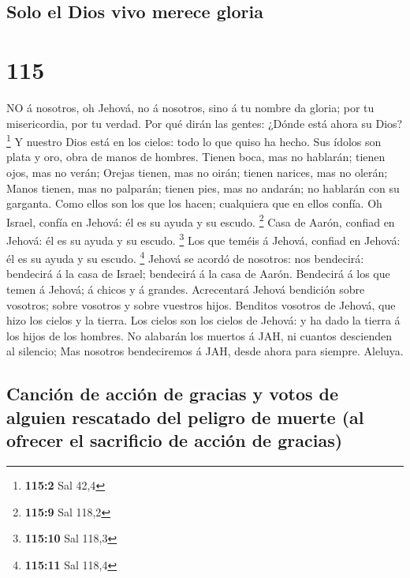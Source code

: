 \hypertarget{solo-el-dios-vivo-merece-gloria}{%
\subsection{Solo el Dios vivo merece
gloria}\label{solo-el-dios-vivo-merece-gloria}}

\hypertarget{section-114}{%
\section{115}\label{section-114}}

 NO á nosotros, oh Jehová, no á nosotros, sino á tu nombre
da gloria; por tu misericordia, por tu verdad.  Por qué
dirán las gentes: ¿Dónde está ahora su Dios? \footnote{\textbf{115:2}
  Sal 42,4}  Y nuestro Dios está en los cielos: todo lo que
quiso ha hecho.  Sus ídolos son plata y oro, obra de manos
de hombres.  Tienen boca, mas no hablarán; tienen ojos, mas
no verán;  Orejas tienen, mas no oirán; tienen narices, mas
no olerán;  Manos tienen, mas no palparán; tienen pies, mas
no andarán; no hablarán con su garganta.  Como ellos son los
que los hacen; cualquiera que en ellos confía.  Oh Israel,
confía en Jehová: él es su ayuda y su escudo. \footnote{\textbf{115:9}
  Sal 118,2}  Casa de Aarón, confiad en Jehová: él es su
ayuda y su escudo. \footnote{\textbf{115:10} Sal 118,3} 
Los que teméis á Jehová, confiad en Jehová: él es su ayuda y su escudo.
\footnote{\textbf{115:11} Sal 118,4}  Jehová se acordó de
nosotros: nos bendecirá: bendecirá á la casa de Israel; bendecirá á la
casa de Aarón.  Bendecirá á los que temen á Jehová; á
chicos y á grandes.  Acrecentará Jehová bendición sobre
vosotros; sobre vosotros y sobre vuestros hijos.  Benditos
vosotros de Jehová, que hizo los cielos y la tierra.  Los
cielos son los cielos de Jehová: y ha dado la tierra á los hijos de los
hombres.  No alabarán los muertos á JAH, ni cuantos
descienden al silencio;  Mas nosotros bendeciremos á JAH,
desde ahora para siempre. Aleluya.

\hypertarget{canciuxf3n-de-acciuxf3n-de-gracias-y-votos-de-alguien-rescatado-del-peligro-de-muerte-al-ofrecer-el-sacrificio-de-acciuxf3n-de-gracias}{%
\subsection{Canción de acción de gracias y votos de alguien rescatado
del peligro de muerte (al ofrecer el sacrificio de acción de
gracias)}\label{canciuxf3n-de-acciuxf3n-de-gracias-y-votos-de-alguien-rescatado-del-peligro-de-muerte-al-ofrecer-el-sacrificio-de-acciuxf3n-de-gracias}}

